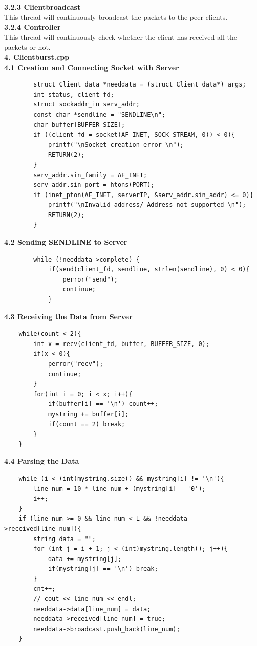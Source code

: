 \documentclass[12pt]{scrartcl}
\begin{document}
\textbf{3.2.3 Clientbroadcast}\\
This thread will continuously broadcast the packets to the peer clients.\\
\textbf{3.2.4 Controller}\\
This thread will continuously check whether the client has received all the packets or not.
\\
\textbf{4. Clientburst.cpp}\\
\textbf{4.1 Creation and Connecting Socket with Server}
\begin{verbatim}
        struct Client_data *needdata = (struct Client_data*) args;
        int status, client_fd;
        struct sockaddr_in serv_addr;
        const char *sendline = "SENDLINE\n";
        char buffer[BUFFER_SIZE];
        if ((client_fd = socket(AF_INET, SOCK_STREAM, 0)) < 0){
            printf("\nSocket creation error \n");
            RETURN(2);
        }
        serv_addr.sin_family = AF_INET;
        serv_addr.sin_port = htons(PORT);
        if (inet_pton(AF_INET, serverIP, &serv_addr.sin_addr) <= 0){
            printf("\nInvalid address/ Address not supported \n");
            RETURN(2);
        }
\end{verbatim}
\textbf{4.2 Sending SENDLINE to Server}
\begin{verbatim}
        while (!needdata->complete) {
            if(send(client_fd, sendline, strlen(sendline), 0) < 0){
                perror("send");
                continue;
            }
\end{verbatim}
\textbf{4.3 Receiving the Data from Server}
\begin{verbatim}
    while(count < 2){
        int x = recv(client_fd, buffer, BUFFER_SIZE, 0);
        if(x < 0){
            perror("recv");
            continue;
        }
        for(int i = 0; i < x; i++){
            if(buffer[i] == '\n') count++;
            mystring += buffer[i];
            if(count == 2) break;
        }
    }
\end{verbatim}
\textbf{4.4 Parsing the Data}
\begin{verbatim}
    while (i < (int)mystring.size() && mystring[i] != '\n'){
        line_num = 10 * line_num + (mystring[i] - '0');
        i++;
    }
    if (line_num >= 0 && line_num < L && !needdata->received[line_num]){
        string data = "";
        for (int j = i + 1; j < (int)mystring.length(); j++){
            data += mystring[j];
            if(mystring[j] == '\n') break;
        }
        cnt++;
        // cout << line_num << endl;
        needdata->data[line_num] = data;
        needdata->received[line_num] = true;
        needdata->broadcast.push_back(line_num);
    }
\end{verbatim}\\
\end{document}
